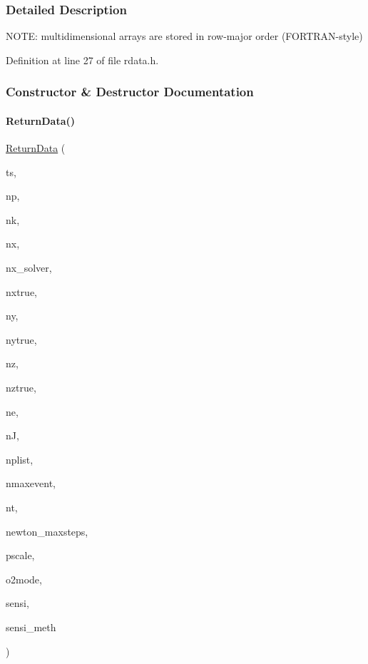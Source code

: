 \subsubsection{Detailed Description}
N\+O\+TE\+: multidimensional arrays are stored in row-\/major order (F\+O\+R\+T\+R\+A\+N-\/style) 

Definition at line 27 of file rdata.\+h.



\subsubsection{Constructor \& Destructor Documentation}
\mbox{\label{classamici_1_1_return_data_a8074ea697eda3da616136da2c30bc503}} 
\paragraph{\texorpdfstring{ReturnData()}{ReturnData()}\hspace{0.1cm}{\footnotesize\ttfamily [1/2]}}
{\footnotesize\ttfamily \mbox{\hyperlink{classamici_1_1_return_data}{Return\+Data}} (\begin{DoxyParamCaption}\item[{std\+::vector$<$ \mbox{\hyperlink{namespaceamici_a1bdce28051d6a53868f7ccbf5f2c14a3}{realtype}} $>$}]{ts,  }\item[{int}]{np,  }\item[{int}]{nk,  }\item[{int}]{nx,  }\item[{int}]{nx\+\_\+solver,  }\item[{int}]{nxtrue,  }\item[{int}]{ny,  }\item[{int}]{nytrue,  }\item[{int}]{nz,  }\item[{int}]{nztrue,  }\item[{int}]{ne,  }\item[{int}]{nJ,  }\item[{int}]{nplist,  }\item[{int}]{nmaxevent,  }\item[{int}]{nt,  }\item[{int}]{newton\+\_\+maxsteps,  }\item[{std\+::vector$<$ \mbox{\hyperlink{namespaceamici_a42f062082226e9284c201d9eab71a3a0}{Parameter\+Scaling}} $>$}]{pscale,  }\item[{\mbox{\hyperlink{namespaceamici_a2d77779286167d5603a870bf9f6c21ba}{Second\+Order\+Mode}}}]{o2mode,  }\item[{\mbox{\hyperlink{namespaceamici_aaa03ec2f8c4d5323b98d71134a462fda}{Sensitivity\+Order}}}]{sensi,  }\item[{\mbox{\hyperlink{namespaceamici_aa0fa493529f6872e7e776b91fbbf38f9}{Sensitivity\+Method}}}]{sensi\+\_\+meth }\end{DoxyParamCaption})}


